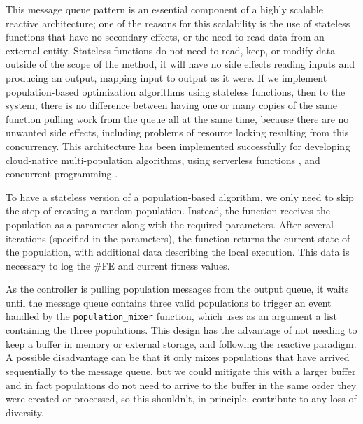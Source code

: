 \documentclass[runningheads]{llncs}
\begin{document}
This message queue pattern is an essential component of a highly
scalable reactive architecture; one of the reasons for this
scalability is the use of stateless functions that have no secondary
effects, or the need to read data from an external entity. Stateless
functions do not need to read, keep, or modify data outside of the
scope of the method, it will have no side effects reading inputs and
producing an output, mapping input to output as it were. If we
implement population-based optimization algorithms using stateless
functions, then to the system, there is no difference between having
one or many copies of the same function pulling work from the queue
all at the same time, because there are no unwanted side effects,
including problems of resource locking resulting from this
concurrency. This architecture has been implemented successfully for
developing cloud-native multi-population algorithms, using serverless
functions \cite{garcia2018modern}, and concurrent programming
\cite{guervos2019improving}.

To have a stateless version of a population-based algorithm, we only need to
skip the step of creating a random population. Instead, the function receives
the population as a parameter along with the required parameters. After several
iterations (specified in the parameters), the function returns the current state
of the population, with additional data describing the local execution. This
data is necessary to log the \#FE and current fitness values.


As the controller is pulling population messages from the output
queue, it waits until the message queue contains three valid
populations to trigger an event handled by the
\texttt{population\_mixer} function, which uses as an argument a list
containing the three populations. This design has the advantage of not
needing to keep a buffer in memory or external storage, and following
the reactive paradigm. A possible disadvantage can be that it only
mixes populations that have arrived sequentially to the message queue,
but we could mitigate this with a larger buffer and in fact
populations do not need to arrive to the buffer in the same order they
were created or processed, so this shouldn't, in principle, contribute
to any loss of diversity.
\end{document}
